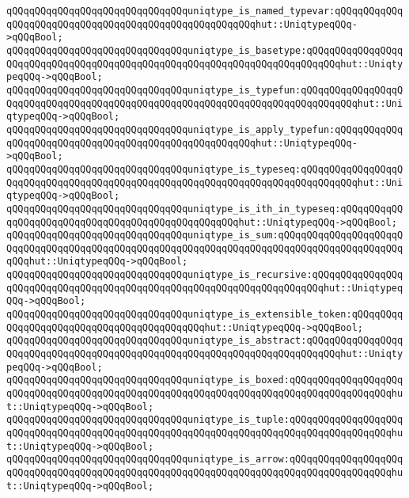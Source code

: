 \verb|qQQqqQQqqQQqqQQqqQQqqQQqqQQqqQQquniqtype_is_named_typevar:qQQqqQQqqQQqqQQqqQQqqQQqqQQqqQQqqQQqqQQqqQQqqQQqqQQqqQQqhut::UniqtypeqQQq->qQQqBool;|\newline
\verb|qQQqqQQqqQQqqQQqqQQqqQQqqQQqqQQquniqtype_is_basetype:qQQqqQQqqQQqqQQqqQQqqQQqqQQqqQQqqQQqqQQqqQQqqQQqqQQqqQQqqQQqqQQqqQQqqQQqqQQqhut::UniqtypeqQQq->qQQqBool;|\newline
\verb|qQQqqQQqqQQqqQQqqQQqqQQqqQQqqQQquniqtype_is_typefun:qQQqqQQqqQQqqQQqqQQqqQQqqQQqqQQqqQQqqQQqqQQqqQQqqQQqqQQqqQQqqQQqqQQqqQQqqQQqqQQqhut::UniqtypeqQQq->qQQqBool;|\newline
\verb|qQQqqQQqqQQqqQQqqQQqqQQqqQQqqQQquniqtype_is_apply_typefun:qQQqqQQqqQQqqQQqqQQqqQQqqQQqqQQqqQQqqQQqqQQqqQQqqQQqqQQqhut::UniqtypeqQQq->qQQqBool;|\newline
\verb|qQQqqQQqqQQqqQQqqQQqqQQqqQQqqQQquniqtype_is_typeseq:qQQqqQQqqQQqqQQqqQQqqQQqqQQqqQQqqQQqqQQqqQQqqQQqqQQqqQQqqQQqqQQqqQQqqQQqqQQqqQQqhut::UniqtypeqQQq->qQQqBool;|\newline
\verb|qQQqqQQqqQQqqQQqqQQqqQQqqQQqqQQquniqtype_is_ith_in_typeseq:qQQqqQQqqQQqqQQqqQQqqQQqqQQqqQQqqQQqqQQqqQQqqQQqqQQqhut::UniqtypeqQQq->qQQqBool;|\newline
\verb|qQQqqQQqqQQqqQQqqQQqqQQqqQQqqQQquniqtype_is_sum:qQQqqQQqqQQqqQQqqQQqqQQqqQQqqQQqqQQqqQQqqQQqqQQqqQQqqQQqqQQqqQQqqQQqqQQqqQQqqQQqqQQqqQQqqQQqqQQqhut::UniqtypeqQQq->qQQqBool;|\newline
\verb|qQQqqQQqqQQqqQQqqQQqqQQqqQQqqQQquniqtype_is_recursive:qQQqqQQqqQQqqQQqqQQqqQQqqQQqqQQqqQQqqQQqqQQqqQQqqQQqqQQqqQQqqQQqqQQqqQQqhut::UniqtypeqQQq->qQQqBool;|\newline
\verb|qQQqqQQqqQQqqQQqqQQqqQQqqQQqqQQquniqtype_is_extensible_token:qQQqqQQqqQQqqQQqqQQqqQQqqQQqqQQqqQQqqQQqqQQqhut::UniqtypeqQQq->qQQqBool;|\newline
\verb|qQQqqQQqqQQqqQQqqQQqqQQqqQQqqQQquniqtype_is_abstract:qQQqqQQqqQQqqQQqqQQqqQQqqQQqqQQqqQQqqQQqqQQqqQQqqQQqqQQqqQQqqQQqqQQqqQQqqQQqhut::UniqtypeqQQq->qQQqBool;|\newline
\verb|qQQqqQQqqQQqqQQqqQQqqQQqqQQqqQQquniqtype_is_boxed:qQQqqQQqqQQqqQQqqQQqqQQqqQQqqQQqqQQqqQQqqQQqqQQqqQQqqQQqqQQqqQQqqQQqqQQqqQQqqQQqqQQqqQQqhut::UniqtypeqQQq->qQQqBool;|\newline
\verb|qQQqqQQqqQQqqQQqqQQqqQQqqQQqqQQquniqtype_is_tuple:qQQqqQQqqQQqqQQqqQQqqQQqqQQqqQQqqQQqqQQqqQQqqQQqqQQqqQQqqQQqqQQqqQQqqQQqqQQqqQQqqQQqqQQqhut::UniqtypeqQQq->qQQqBool;|\newline
\verb|qQQqqQQqqQQqqQQqqQQqqQQqqQQqqQQquniqtype_is_arrow:qQQqqQQqqQQqqQQqqQQqqQQqqQQqqQQqqQQqqQQqqQQqqQQqqQQqqQQqqQQqqQQqqQQqqQQqqQQqqQQqqQQqqQQqhut::UniqtypeqQQq->qQQqBool;|\newline
